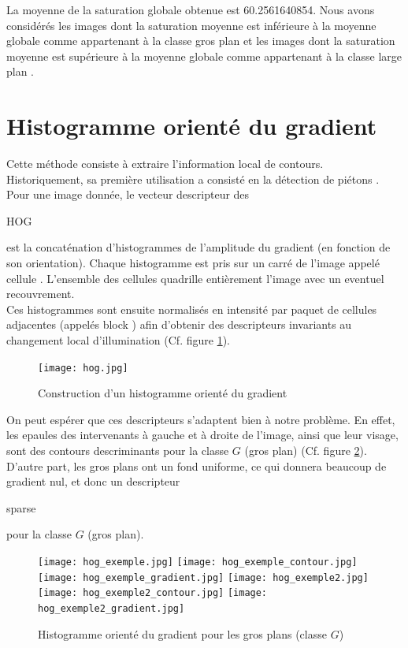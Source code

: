 \documentclass{book}
\begin{document}
La moyenne de la saturation globale obtenue est 60.2561640854. 
Nous avons considérés les images dont la saturation moyenne est inférieure à la moyenne globale comme appartenant à la classe \og gros plan \fg{} et les images dont 
la saturation moyenne est supérieure à la moyenne globale comme appartenant à la classe \og large plan \fg{}.

\section{Histogramme orienté du gradient}

Cette méthode consiste à extraire l'information local de contours. Historiquement, sa première utilisation a consisté en 
la détection de piétons \cite{hog}. Pour une image donnée, le vecteur descripteur des \begin{itshape}HOG\end{itshape} est la concaténation
d'histogrammes de l'amplitude du gradient (en fonction de son orientation). Chaque histogramme est pris sur un carré de l'image
appelé \og cellule \fg{}. L'ensemble des cellules quadrille entièrement l'image avec un eventuel recouvrement.\\
Ces histogrammes sont ensuite normalisés en intensité par paquet de cellules adjacentes (appelés \og block \fg{}) afin d'obtenir des descripteurs 
invariants au changement local d'illumination (Cf. figure \ref{hog}).
\begin{figure}[H]
\begin{center}
\texttt{[image: hog.jpg]}
\end{center}
\caption{Construction d'un histogramme orienté du gradient \cite{hog2}}
\label{hog}
\end{figure}

On peut espérer que ces descripteurs s'adaptent bien à notre problème. En effet, les epaules des intervenants à gauche 
et à droite de l'image, ainsi que leur visage, sont des contours descriminants pour la classe $G$ (gros plan)
(Cf. figure \ref{hog_classeG}). D'autre part, les gros plans ont un fond uniforme, 
ce qui donnera beaucoup de gradient nul, et donc un descripteur \begin{itshape}sparse\end{itshape} pour la classe $G$ (gros plan).

\begin{figure}[H]
\begin{center}
\texttt{[image: hog\_exemple.jpg]}
\texttt{[image: hog\_exemple\_contour.jpg]}
\texttt{[image: hog\_exemple\_gradient.jpg]}
\texttt{[image: hog\_exemple2.jpg]}
\texttt{[image: hog\_exemple2\_contour.jpg]}
\texttt{[image: hog\_exemple2\_gradient.jpg]}
\end{center}
\caption{Histogramme orienté du gradient pour les gros plans (classe $G$)}
\label{hog_classeG}
\end{figure}
\end{document}
